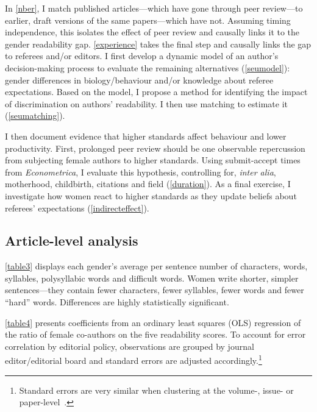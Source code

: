 In \autoref{nber}, I match published articles---which have gone through peer review---to earlier, draft versions of the same papers---which have not. Assuming timing independence, this isolates the effect of peer review and causally links it to the gender readability gap. \autoref{experience} takes the final step and causally links the gap to referees and\slash or editors. I first develop a dynamic model of an author's decision-making process to evaluate the remaining alternatives (\autoref{seumodel}): gender differences in biology\slash behaviour and\slash or knowledge about referee expectations. Based on the model, I propose a method for identifying the impact of discrimination on authors' readability. I then use matching to estimate it (\autoref{seumatching}).

I then document evidence that higher standards affect behaviour and lower productivity. First, prolonged peer review should be one observable repercussion from subjecting female authors to higher standards. Using submit-accept times from \emph{Econometrica}, I evaluate this hypothesis, controlling for, \emph{inter alia}, motherhood, childbirth, citations and field (\autoref{duration}). As a final exercise, I investigate how women react to higher standards as they update beliefs about referees' expectations (\autoref{indirecteffect}).

\subsection{Article-level analysis}
\label{articlelevel}

\autoref{table3} displays each gender's average per sentence number of characters, words, syllables, polysyllabic words and difficult words. Women write shorter, simpler sentences---they contain fewer characters, fewer syllables, fewer words and fewer ``hard'' words. Differences are highly statistically significant.

\autoref{table4} presents coefficients from an ordinary least squares (OLS) regression of the ratio of female co-authors on the five readability scores. To account for error correlation by editorial policy, observations are grouped by journal editor\slash editorial board and standard errors are adjusted accordingly.\footnote{Standard errors are very similar when clustering at the volume-, issue- or paper-level~\citep[see][p. 39--41]{Hengel2016}.}



